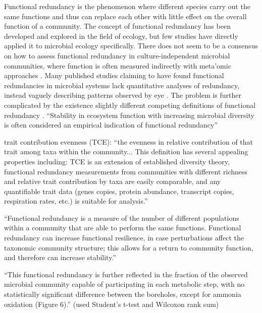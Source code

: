 \documentclass[11pt]{article}
\begin{document}
Functional redundancy is the phenomenon where different species carry out the same functions and thus can replace each other with little effect on the overall function of a community.
The concept of functional redundancy has been developed and explored in the field of ecology,
but few studies have directly applied it to microbial ecology specifically.
There does not seem to be a consensus on how to assess functional redundancy in culture-independent microbial communities,
where function is often measured indirectly with meta'omic approaches \cite{ricotta_measuring_2016, louca_function_2018, heintz-buschart_human_2018, royalty_quantitative_2020}.
Many published studies claiming to have found functional redundancies in microbial systems lack quantitative analyses of redundancy,
instead vaguely describing patterns observed by eye \cite{souza_metagenomic_2015, ferrer_microbiota_2013, galambos_genome-resolved_2019}.
The problem is further complicated by the existence slightly different competing definitions of functional redundancy \cite{louca_function_2018, heintz-buschart_human_2018, tully_dynamic_2018, royalty_quantitative_2020}.
``Stability in ecosystem function with increasing microbial diversity is often considered an empirical indication of functional redundancy''
\cite{royalty_quantitative_2020}


trait contribution evenness (TCE): ``the evenness in relative contribution of that trait among taxa within the community... This definition has several appealing properties including: TCE is an extension of established diversity theory, functional redundancy measurements from communities with different richness and relative trait contribution by taxa are easily comparable, and any quantifiable trait data (genes copies, protein abundance, transcript copies, respiration rates, etc.) is suitable for analysis.'' \cite{royalty_quantitative_2020}

``Functional redundancy is a measure of the number of different populations within a community that are able to perform the same functions. Functional redundancy can increase functional resilience, in case perturbations affect the taxonomic community structure; this allows for a return to community function, and therefore can increase stability.'' \cite{heintz-buschart_human_2018}

``This functional redundancy is further reflected in the fraction of the observed microbial community capable of participating in each metabolic step, with no statistically significant difference between the boreholes, except for ammonia oxidation (Figure 6).'' (used Student's t-test and Wilcoxon rank sum) \cite{tully_dynamic_2018}
\end{document}
